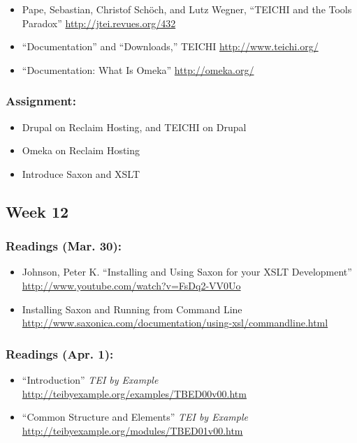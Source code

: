 \documentclass[]{article}
\begin{document}
\begin{itemize}
\itemsep1pt\parskip0pt
\item
  Pape, Sebastian, Christof Schöch, and Lutz Wegner, ``TEICHI and the
  Tools Paradox'' \url{http://jtei.revues.org/432}
\item
  ``Documentation'' and ``Downloads,'' TEICHI
  \url{http://www.teichi.org/}
\item
  ``Documentation: What Is Omeka'' \url{http://omeka.org/}
\end{itemize}

\subsubsection{Assignment:}\label{assignment-4}

\begin{itemize}
\itemsep1pt\parskip0pt
\item
  Drupal on Reclaim Hosting, and TEICHI on Drupal
\item
  Omeka on Reclaim Hosting
\item
  Introduce Saxon and XSLT
\end{itemize}

\subsection{Week 12}\label{week-12}

\subsubsection{Readings (Mar. 30):}\label{readings-mar.-30}

\begin{itemize}
\itemsep1pt\parskip0pt
\item
  Johnson, Peter K. ``Installing and Using Saxon for your XSLT
  Development'' \url{http://www.youtube.com/watch?v=FsDq2-VV0Uo}
\item
  Installing Saxon and Running from Command Line
  \url{http://www.saxonica.com/documentation/using-xsl/commandline.html}
\end{itemize}

\subsubsection{Readings (Apr. 1):}\label{readings-apr.-1}

\begin{itemize}
\itemsep1pt\parskip0pt
\item
  ``Introduction'' \emph{TEI by Example}
  \url{http://teibyexample.org/examples/TBED00v00.htm}
\item
  ``Common Structure and Elements'' \emph{TEI by Example}
  \url{http://teibyexample.org/modules/TBED01v00.htm}
\end{itemize}
\end{document}
